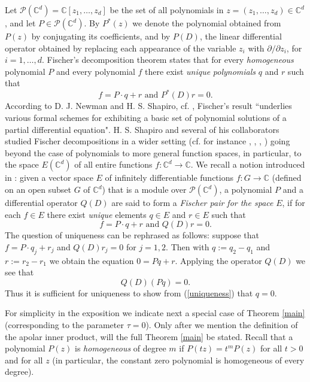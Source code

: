 \documentclass[12pt]{amsart}
\begin{document}
Let $\mathcal{P}\left(  \mathbb{C}^{d}\right)  = \mathbb{C}[z_{1}, \dots,
z_{d}]$ be the set of all polynomials in $z=\left(  z_{1},\dots,z_{d}\right)
\in\mathbb{C}^{d}$, and let $P \in\mathcal{P} \left(  \mathbb{C}^{d}\right)
$. By $P^{\ast}\left(  z\right)  $ we denote the polynomial obtained from
$P\left(  z\right)  $ by conjugating its coefficients, and by $P\left(
D\right)  $, the linear differential operator obtained by replacing each
appearance of the variable $z_{i}$ with $\partial/\partial{z_{i}}$, for
$i=1,\dots,d$. Fischer's decomposition theorem states that for every
\emph{homogeneous} polynomial $P$ and every polynomial $f$ there exist
\emph{unique} \emph{polynomials} $q$ and $r$ such that%
\[
f=P\cdot q+r\text{ and }P^{\ast}\left(  D\right)  r=0.
\]
According to D. J. Newman and H. S. Shapiro, cf. \cite[pg. 971]{NeSh66},
Fischer's result ``underlies various formal schemes for exhibiting a basic set
of polynomial solutions of a partial differential equation". H. S. Shapiro and
several of his collaborators studied Fischer decompositions in a wider setting
(cf. for instance \cite{Shap89}, \cite{KhSh92}, \cite{EbSh95}, \cite{EbSh96})
going beyond the case of polynomials to more general function spaces, in
particular, to the space $E\left(  \mathbb{C}^{d}\right)  $ of all entire
functions $f:\mathbb{C}^{d}\rightarrow\mathbb{C}$. We recall a notion
introduced in \cite[p. 522]{Shap89}: given a vector space $E$ of infinitely
differentiable functions $f:G\rightarrow\mathbb{C }$ (defined on an open
subset $G$ of $\mathbb{C}^{d}$) that is a module over $\mathcal{P}\left(
\mathbb{C}^{d}\right)  $, a polynomial $P$ and a differential operator
$Q\left(  D\right)  $ are said to form a \emph{Fischer pair for the space }%
$E$, if for each $f\in E$ there exist \emph{unique} elements $q\in E$ and
$r\in E$ such that
\begin{equation}
	f=P\cdot q+r\text{ and }Q\left(  D\right)  r=0. \label{eqDecomp}%
\end{equation}
 The question of uniqueness can be rephrased as follows: suppose that $f=P\cdot
q_{j}+r_{j}$ and $Q\left(  D\right)  r_{j}=0$ for $j=1,2.$ Then
with $q:=q_{2}-q_{1}$ and $r := r_{2}-r_{1}$ we obtain the equation $0=Pq+r.$
Applying the operator $Q\left(  D\right)  $ we see that
\begin{equation}
	Q\left(  D\right)  \left(  Pq\right)  =0. \label{uniqueness}
\end{equation}
Thus it is sufficient for uniqueness to show from (\ref{uniqueness}) that
$q=0.$

For simplicity in the exposition we indicate next a special case of Theorem \ref{main}
(corresponding to the parameter $\tau= 0$).  Only after we mention the definition of the apolar inner product,  will the full Theorem \ref{main} be
stated. Recall that a
polynomial $P\left(  z\right)  $ is \emph{homogeneous} of degree $m$ if
$P\left(  tz \right)  =t^{m}P\left(  z\right)  $ for all $t>0$ and for all
$z$ (in particular, the constant zero polynomial is homogeneous of every
degree).
\end{document}
